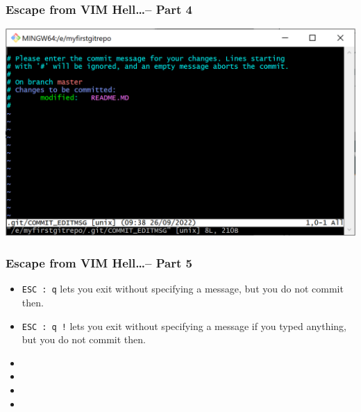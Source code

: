 \documentclass[12pt,english]{beamer}
\begin{document}
\begin{frame}
\frametitle{Escape from VIM Hell\ldots -- Part 4}

\includegraphics[width=\textwidth]{vim-hell}

\end{frame}

\begin{frame}
\frametitle{Escape from VIM Hell\ldots -- Part 5}

\begin{itemize}
\item \texttt{ESC}~\texttt{:}~\texttt{q} lets you exit without specifying a message, but you do not commit then.
\item \texttt{ESC}~\texttt{:}~\texttt{q}~\texttt{!} lets you exit without specifying a message if you typed anything, but you do not commit then.
\item 
\item 
\item 
\item 
\end{itemize}
\end{frame}

 
\end{document}

